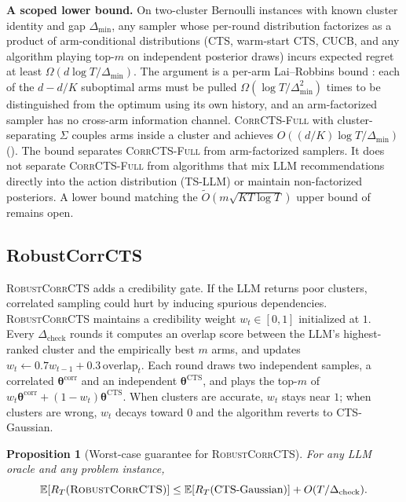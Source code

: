 \documentclass{article}
\theoremstyle{plain}
\newtheorem{proposition}[theorem]{Proposition}
\theoremstyle{definition}
\theoremstyle{remark}
\newcommand{\E}{\mathbb{E}}
\newcommand{\gap}{\Delta_{\min}}
\newcommand{\CorrFull}{\textsc{CorrCTS-Full}}
\newcommand{\RobustCorr}{\textsc{RobustCorrCTS}}
\begin{document}
\textbf{A scoped lower bound.}
On two-cluster Bernoulli instances with known cluster identity and gap $\gap$, any sampler whose per-round distribution factorizes as a product of arm-conditional distributions (CTS, warm-start CTS, CUCB, and any algorithm playing top-$m$ on independent posterior draws) incurs expected regret at least $\Omega(d \log T / \gap)$.
The argument is a per-arm Lai--Robbins bound \citep{lai1985asymptotically}: each of the $d - d/K$ suboptimal arms must be pulled $\Omega(\log T / \gap^2)$ times to be distinguished from the optimum using its own history, and an arm-factorized sampler has no cross-arm information channel.
\CorrFull{} with cluster-separating $\Sigma$ couples arms inside a cluster and achieves $O((d/K) \log T / \gap)$ ().
The bound separates \CorrFull{} from arm-factorized samplers. It does not separate \CorrFull{} from algorithms that mix LLM recommendations directly into the action distribution (TS-LLM) or maintain non-factorized posteriors. A lower bound matching the $\tilde O(m\sqrt{KT\log T})$ upper bound of  remains open.

\subsection{RobustCorrCTS}\label{sec:n4}

\RobustCorr{} adds a credibility gate.
If the LLM returns poor clusters, correlated sampling could hurt by inducing spurious dependencies.
\RobustCorr{} maintains a credibility weight $w_t \in [0,1]$ initialized at $1$.
Every $\Delta_{\text{check}}$ rounds it computes an overlap score between the LLM's highest-ranked cluster and the empirically best $m$ arms, and updates $w_t \gets 0.7 w_{t-1} + 0.3 \, \text{overlap}_t$.
Each round draws two independent samples, a correlated $\boldsymbol{\theta}^{\text{corr}}$ and an independent $\boldsymbol{\theta}^{\text{CTS}}$, and plays the top-$m$ of $w_t \boldsymbol{\theta}^{\text{corr}} + (1 - w_t) \boldsymbol{\theta}^{\text{CTS}}$.
When clusters are accurate, $w_t$ stays near $1$; when clusters are wrong, $w_t$ decays toward $0$ and the algorithm reverts to CTS-Gaussian.

\begin{proposition}[Worst-case guarantee for \RobustCorr{}]\label{prop:robust}
For any LLM oracle and any problem instance,
\[
\E[R_T(\RobustCorr{})] \leq \E[R_T(\textnormal{CTS-Gaussian})] + O(T / \Delta_{\text{check}}).
\]
\end{proposition}
\end{document}
